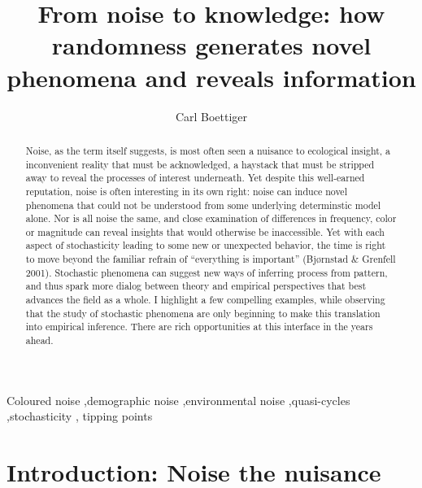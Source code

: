 \documentclass[
  authoryear,
  preprint,
  3p]{elsarticle}
\begin{document}
\begin{frontmatter}
\title{From noise to knowledge: how randomness generates novel phenomena
and reveals information}
\author[1]{Carl Boettiger%
%
}



        
\begin{abstract}
Noise, as the term itself suggests, is most often seen a nuisance to
ecological insight, a inconvenient reality that must be acknowledged, a
haystack that must be stripped away to reveal the processes of interest
underneath. Yet despite this well-earned reputation, noise is often
interesting in its own right: noise can induce novel phenomena that
could not be understood from some underlying determinstic model alone.
Nor is all noise the same, and close examination of differences in
frequency, color or magnitude can reveal insights that would otherwise
be inaccessible. Yet with each aspect of stochasticity leading to some
new or unexpected behavior, the time is right to move beyond the
familiar refrain of ``everything is important'' (Bjørnstad \& Grenfell
2001). Stochastic phenomena can suggest new ways of inferring process
from pattern, and thus spark more dialog between theory and empirical
perspectives that best advances the field as a whole. I highlight a few
compelling examples, while observing that the study of stochastic
phenomena are only beginning to make this translation into empirical
inference. There are rich opportunities at this interface in the years
ahead.
\end{abstract}





\begin{keyword}
    Coloured noise \sep demographic noise \sep environmental
noise \sep quasi-cycles \sep stochasticity \sep 
    tipping points
\end{keyword}
\end{frontmatter}
    
\section{Introduction: Noise the
nuisance}\label{introduction-noise-the-nuisance}
\end{document}
